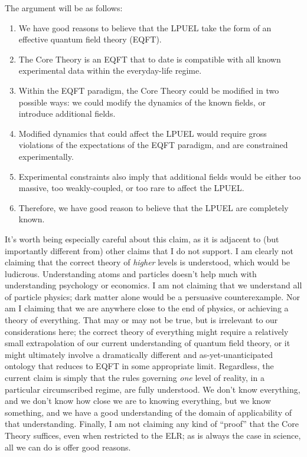 \documentclass[12pt,letterpaper]{article}
\begin{document}
The argument will be as follows:
\begin{enumerate}
\item We have good reasons to believe that the LPUEL take the form of an effective quantum field theory (EQFT).
\item The Core Theory is an EQFT that to date is compatible with all known experimental data within the everyday-life regime.
\item Within the EQFT paradigm, the Core Theory could be modified in two possible ways: we could modify the dynamics of the known fields, or introduce additional fields.
\item Modified dynamics that could affect the LPUEL would require gross violations of the expectations of the EQFT paradigm, and are constrained experimentally.
\item Experimental constraints also imply that additional fields would be either too massive, too weakly-coupled, or too rare to affect the LPUEL.
\item Therefore, we have good reason to believe that the LPUEL are completely known.
\end{enumerate}

It's worth being especially careful about this claim, as it is adjacent to (but importantly different from) other claims that I do not support.
I am clearly not claiming that the correct theory of \emph{higher} levels is understood, which would be ludicrous.
Understanding atoms and particles doesn't help much with understanding psychology or economics.
I am not claiming that we understand all of particle physics; dark matter alone would be a persuasive counterexample.
Nor am I claiming that we are anywhere close to the end of physics, or achieving a theory of everything.
That may or may not be true, but is irrelevant to our considerations here; the correct theory of everything might require a relatively small extrapolation of our current understanding of quantum field theory, or it might ultimately involve a dramatically different and as-yet-unanticipated ontology that reduces to EQFT in some appropriate limit.
Regardless, the current claim is simply that the rules governing \emph{one} level of reality, in a particular circumscribed regime, are fully understood.
We don't know everything, and we don't know how close we are to knowing everything, but we know something, and we have a good understanding of the domain of applicability of that understanding.
Finally, I am not claiming any kind of ``proof'' that the Core Theory suffices, even when restricted to the ELR; as is always the case in science, all we can do is offer good reasons.
\end{document}
